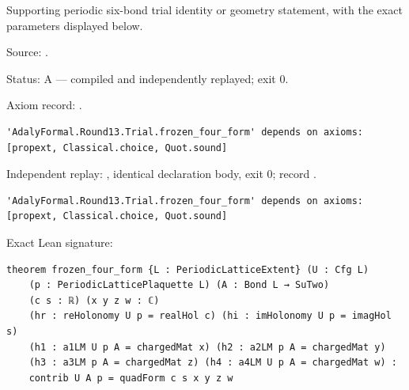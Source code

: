 \begin{theorem}[bp-395]
\label{bp-395}
\leanok
Supporting periodic six-bond trial identity or geometry statement, with the exact parameters displayed below.

\par Source: \texttt{}.
\par Status: A — compiled and independently replayed; exit 0.
\par Axiom record: \texttt{}.
\begin{verbatim}
'AdalyFormal.Round13.Trial.frozen_four_form' depends on axioms: [propext, Classical.choice, Quot.sound]
\end{verbatim}
\par Independent replay: \texttt{}, identical declaration body, exit 0; record \texttt{}.
\begin{verbatim}
'AdalyFormal.Round13.Trial.frozen_four_form' depends on axioms: [propext, Classical.choice, Quot.sound]
\end{verbatim}
\par Exact Lean signature:
\begin{verbatim}
theorem frozen_four_form {L : PeriodicLatticeExtent} (U : Cfg L)
    (p : PeriodicLatticePlaquette L) (A : Bond L → SuTwo)
    (c s : ℝ) (x y z w : ℂ)
    (hr : reHolonomy U p = realHol c) (hi : imHolonomy U p = imagHol s)
    (h1 : a1LM U p A = chargedMat x) (h2 : a2LM p A = chargedMat y)
    (h3 : a3LM p A = chargedMat z) (h4 : a4LM U p A = chargedMat w) :
    contrib U A p = quadForm c s x y z w
\end{verbatim}
\end{theorem}

